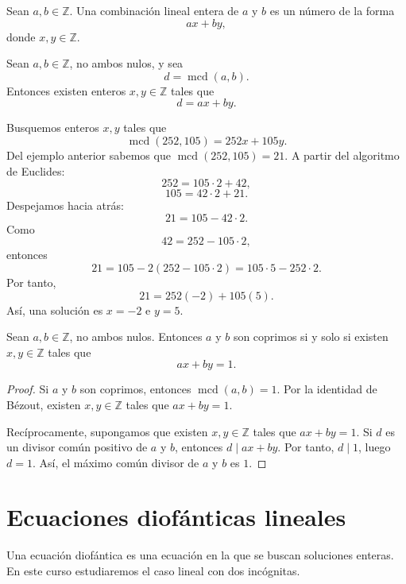 \begin{definicion}
Sean \(a,b\in\mathbb{Z}\). Una combinación lineal entera de \(a\) y \(b\) es un número de la forma
\[
ax+by,
\]
donde \(x,y\in\mathbb{Z}\).
\end{definicion}

\begin{teorema}
Sean \(a,b\in\mathbb{Z}\), no ambos nulos, y sea
\[
d=\operatorname{mcd}(a,b).
\]
Entonces existen enteros \(x,y\in\mathbb{Z}\) tales que
\[
d=ax+by.
\]
\end{teorema}

\begin{ejemplo}
Busquemos enteros \(x,y\) tales que
\[
\operatorname{mcd}(252,105)=252x+105y.
\]
Del ejemplo anterior sabemos que \(\operatorname{mcd}(252,105)=21\). A partir del algoritmo de Euclides:
\[
252=105\cdot 2+42,
\]
\[
105=42\cdot 2+21.
\]
Despejamos hacia atrás:
\[
21=105-42\cdot 2.
\]
Como
\[
42=252-105\cdot 2,
\]
entonces
\[
21=105-2(252-105\cdot 2)=105\cdot 5-252\cdot 2.
\]
Por tanto,
\[
21=252(-2)+105(5).
\]
Así, una solución es \(x=-2\) e \(y=5\).
\end{ejemplo}

\begin{corolario}
Sean \(a,b\in\mathbb{Z}\), no ambos nulos. Entonces \(a\) y \(b\) son coprimos si y solo si existen \(x,y\in\mathbb{Z}\) tales que
\[
ax+by=1.
\]
\end{corolario}

\begin{proof}
Si \(a\) y \(b\) son coprimos, entonces \(\operatorname{mcd}(a,b)=1\). Por la identidad de Bézout, existen \(x,y\in\mathbb{Z}\) tales que \(ax+by=1\).

Recíprocamente, supongamos que existen \(x,y\in\mathbb{Z}\) tales que \(ax+by=1\). Si \(d\) es un divisor común positivo de \(a\) y \(b\), entonces \(d\mid ax+by\). Por tanto, \(d\mid 1\), luego \(d=1\). Así, el máximo común divisor de \(a\) y \(b\) es \(1\).
\end{proof}

\section{Ecuaciones diofánticas lineales}

Una ecuación diofántica es una ecuación en la que se buscan soluciones enteras. En este curso estudiaremos el caso lineal con dos incógnitas.


